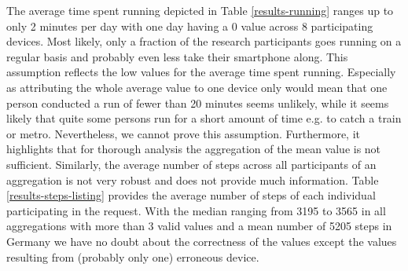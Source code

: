 The average time spent running depicted in Table \ref{results-running} ranges up to only 2 minutes per day with one day having a 0 value across 8 participating devices. Most likely, only a fraction of the research participants goes running on a regular basis and probably even less take their smartphone along. This assumption reflects the low values for the average time spent running. Especially as attributing the whole average value to one device only would mean that one person conducted a run of fewer than 20 minutes seems unlikely, while it seems likely that quite some persons run for a short amount of time e.g. to catch a train or metro. Nevertheless, we cannot prove this assumption. Furthermore, it highlights that for thorough analysis the aggregation of the mean value is not sufficient.
Similarly, the average number of steps across all participants of an aggregation is not very robust and does not provide much information. Table \ref{results-steps-listing} provides the average number of steps of each individual participating in the request. With the median ranging from 3195 to 3565 in all aggregations with more than 3 valid values and a mean number of 5205 steps in Germany \parencite{steps3} we have no doubt about the correctness of the values except the values resulting from (probably only one) erroneous device.

